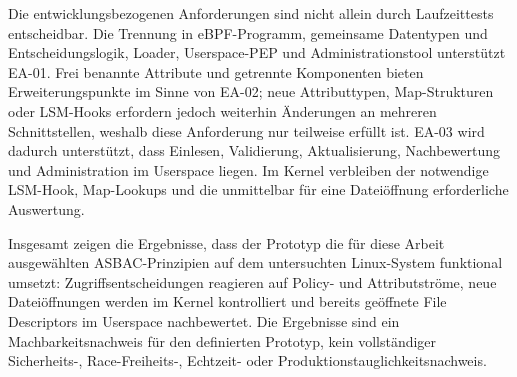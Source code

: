 Die entwicklungsbezogenen Anforderungen sind nicht allein durch Laufzeittests entscheidbar. Die
Trennung in eBPF-Programm, gemeinsame Datentypen und Entscheidungslogik, Loader,
Userspace-PEP und Administrationstool unterstützt EA-01. Frei benannte Attribute und getrennte
Komponenten bieten Erweiterungspunkte im Sinne von EA-02; neue Attributtypen, Map-Strukturen oder
LSM-Hooks erfordern jedoch weiterhin Änderungen an mehreren Schnittstellen, weshalb diese
Anforderung nur teilweise erfüllt ist. EA-03 wird dadurch unterstützt, dass Einlesen,
Validierung, Aktualisierung, Nachbewertung und Administration im Userspace liegen. Im Kernel
verbleiben der notwendige LSM-Hook, Map-Lookups und die unmittelbar für eine Dateiöffnung
erforderliche Auswertung.

Insgesamt zeigen die Ergebnisse, dass der Prototyp die für diese Arbeit ausgewählten
ASBAC-Prinzipien auf dem untersuchten Linux-System funktional umsetzt: Zugriffsentscheidungen
reagieren auf Policy- und Attributströme, neue Dateiöffnungen werden im Kernel kontrolliert und
bereits geöffnete File Descriptors im Userspace nachbewertet. Die Ergebnisse sind ein
Machbarkeitsnachweis für den definierten Prototyp, kein vollständiger Sicherheits-,
Race-Freiheits-, Echtzeit- oder Produktionstauglichkeitsnachweis.

\newpage
